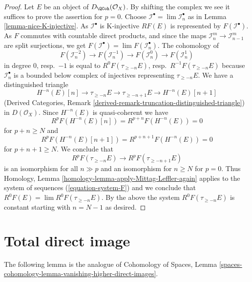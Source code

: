 \begin{proof}
Let $E$ be an object of $D_\QCoh(\mathcal{O}_X)$.
By shifting the complex we see it suffices to prove the assertion
for $p = 0$. Choose $\mathcal{I}^\bullet = \lim \mathcal{I}_n^\bullet$
as in Lemma \ref{lemma-nice-K-injective}.
As $\mathcal{I}^\bullet$ is K-injective $RF(E)$ is represented by
$F(\mathcal{I}^\bullet)$. As $F$ commutes with countable direct
products, and since the maps $\mathcal{I}_n^m \to \mathcal{I}_{n - 1}^m$
are split surjections, we get
$F(\mathcal{I}^\bullet) = \lim F(\mathcal{I}_n^\bullet)$.
The cohomology of
\begin{equation}
\label{equation-system-F}
F(\mathcal{I}_n^{-2}) \to
F(\mathcal{I}_n^{-1}) \to
F(\mathcal{I}_n^0) \to
F(\mathcal{I}_n^1)
\end{equation}
in degree $0$, resp.\ $-1$ is equal to $R^0F(\tau_{\geq -n}E)$,
resp.\ $R^{-1}F(\tau_{\geq -n}E)$ because $\mathcal{I}_n^\bullet$
is a bounded below complex of injectives representing $\tau_{\geq -n}E$.
We have a distinguished triangle
$$
H^{-n}(E)[n] \to \tau_{\geq -n}E \to \tau_{\geq - n + 1}E \to H^{-n}(E)[n + 1]
$$
(Derived Categories, Remark
\ref{derived-remark-truncation-distinguished-triangle})
in $D(\mathcal{O}_X)$. Since $H^{-n}(E)$ is quasi-coherent we have
$$
R^pF(H^{-n}(E)[n]) = R^{p + n}F(H^{-n}(E)) = 0
$$
for $p + n \geq N$ and
$$
R^pF(H^{-n}(E)[n + 1]) = R^{p + n + 1}F(H^{-n}(E)) = 0
$$
for $p + n + 1 \geq N$. We conclude that
$$
R^pF(\tau_{\geq -n}E) \to R^pF(\tau_{\geq - n + 1}E)
$$
is an isomorphism for all $n \gg p$ and an isomorphism for
$n \geq N$ for $p = 0$. Thus
Homology, Lemma \ref{homology-lemma-apply-Mittag-Leffler-again}
applies to the system of sequences (\ref{equation-system-F})
and we conclude that $R^0F(E) = \lim R^0F(\tau_{\geq - n}E)$.
By the above the system $R^0F(\tau_{\geq - n}E)$ is constant starting
with $n = N - 1$ as desired.
\end{proof}









\section{Total direct image}
\label{section-total-direct-image}

\noindent
The following lemma is the analogue of
Cohomology of Spaces, Lemma
\ref{spaces-cohomology-lemma-vanishing-higher-direct-images}.

